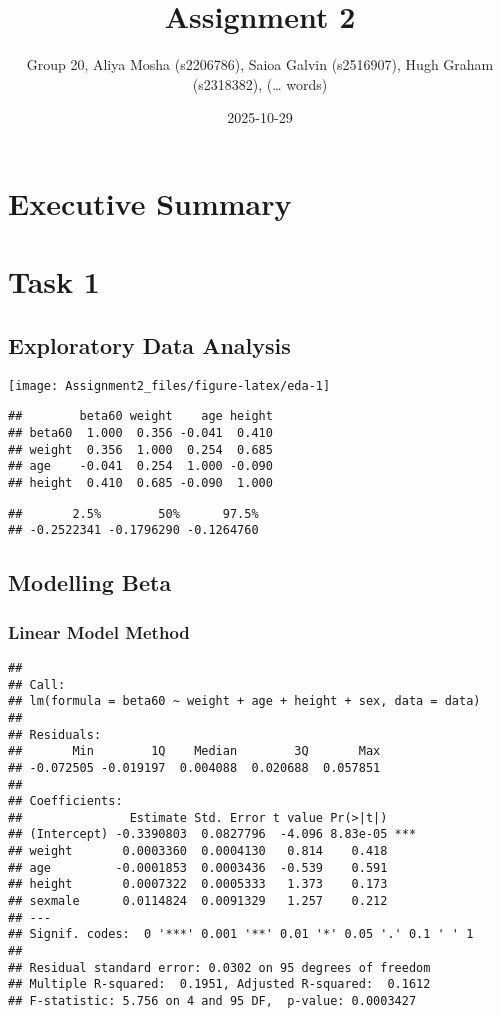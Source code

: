 \documentclass[
]{article}
\title{Assignment 2}
\author{Group 20, Aliya Mosha (s2206786), Saioa Galvin (s2516907), Hugh
Graham (s2318382), (\ldots{} words)}
\date{2025-10-29}
\begin{document}
\maketitle

\section{Executive Summary}\label{executive-summary}

\section{Task 1}\label{task-1}

\subsection{Exploratory Data Analysis}\label{exploratory-data-analysis}

\begin{center}\texttt{[image: Assignment2\_files/figure-latex/eda-1]} \end{center}

\begin{verbatim}
##        beta60 weight    age height
## beta60  1.000  0.356 -0.041  0.410
## weight  0.356  1.000  0.254  0.685
## age    -0.041  0.254  1.000 -0.090
## height  0.410  0.685 -0.090  1.000
\end{verbatim}

\begin{verbatim}
##       2.5%        50%      97.5% 
## -0.2522341 -0.1796290 -0.1264760
\end{verbatim}

\subsection{Modelling Beta}\label{modelling-beta}

\subsubsection{Linear Model Method}\label{linear-model-method}

\begin{verbatim}
## 
## Call:
## lm(formula = beta60 ~ weight + age + height + sex, data = data)
## 
## Residuals:
##       Min        1Q    Median        3Q       Max 
## -0.072505 -0.019197  0.004088  0.020688  0.057851 
## 
## Coefficients:
##               Estimate Std. Error t value Pr(>|t|)    
## (Intercept) -0.3390803  0.0827796  -4.096 8.83e-05 ***
## weight       0.0003360  0.0004130   0.814    0.418    
## age         -0.0001853  0.0003436  -0.539    0.591    
## height       0.0007322  0.0005333   1.373    0.173    
## sexmale      0.0114824  0.0091329   1.257    0.212    
## ---
## Signif. codes:  0 '***' 0.001 '**' 0.01 '*' 0.05 '.' 0.1 ' ' 1
## 
## Residual standard error: 0.0302 on 95 degrees of freedom
## Multiple R-squared:  0.1951, Adjusted R-squared:  0.1612 
## F-statistic: 5.756 on 4 and 95 DF,  p-value: 0.0003427
\end{verbatim}
\end{document}
